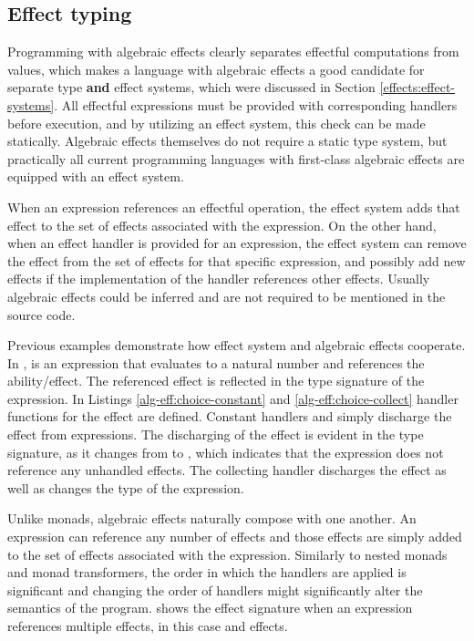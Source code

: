 


\subsection{Effect typing}
Programming with algebraic effects clearly separates effectful computations from values, which makes a language with algebraic effects a good candidate for separate type \textbf{and} effect systems, which were discussed in Section \ref{effects:effect-systems}. All effectful expressions must be provided with corresponding handlers before execution, and by utilizing an effect system, this check can be made statically. Algebraic effects themselves do not require a static type system, but practically all current programming languages with first-class algebraic effects are equipped with an effect system.

When an expression references an effectful operation, the effect system adds that effect to the set of effects associated with the expression. On the other hand, when an effect handler is provided for an expression, the effect system can remove the effect from the set of effects for that specific expression, and possibly add new effects if the implementation of the handler references other effects. Usually algebraic effects could be inferred and are not required to be mentioned in the source code.

Previous examples demonstrate how effect system and algebraic effects cooperate. In ,  is an expression that evaluates to a natural number and references the  ability/effect. The referenced effect is reflected in the type signature of the expression. In Listings \ref{alg-eff:choice-constant} and \ref{alg-eff:choice-collect} handler functions for the  effect are defined. Constant handlers  and  simply discharge the effect from expressions. The discharging of the effect is evident in the type signature, as it changes from  to , which indicates that the expression does not reference any unhandled effects. The collecting handler  discharges the effect as well as changes the type of the expression.

Unlike monads, algebraic effects naturally compose with one another. An expression can reference any number of effects and those effects are simply added to the set of effects associated with the expression. Similarly to nested monads and monad transformers, the order in which the handlers are applied is significant and changing the order of handlers might significantly alter the semantics of the program.  shows the effect signature when an expression references multiple effects, in this case  and  effects.

